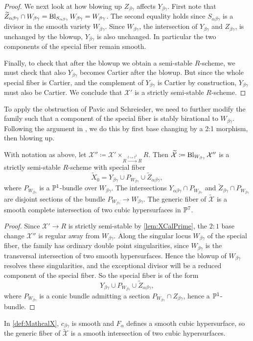 \begin{proof}
We next look at how blowing up $Z_{\beta \gamma}$ affects $Y_{\beta \gamma}$. First note that  $\widetilde{Z}_{\alpha\beta\gamma} \cap W_{\beta\gamma} = \Bl_{S_{\alpha\beta\gamma}} W_{\beta\gamma} = W_{\beta\gamma}$. The second equality holds since $S_{\alpha\beta\gamma}$ is a divisor in the smooth variety $W_{\beta\gamma}$. Since $W_{\beta\gamma}$, the intersection of $Y_{\beta \gamma}$ and $Z_{\beta \gamma}$, is unchanged by the blowup, $Y_{\beta \gamma}$ is also unchanged. In particular the two components of the special fiber remain smooth.

Finally, to check that after the blowup we obtain a semi-stable $R$-scheme, we must check that also $Y_{\beta \gamma}$ becomes Cartier after the blowup. But since the whole special fiber is Cartier, and the complement of $Y_{\beta \gamma}$ is Cartier by construction, $Y_{\beta \gamma}$ must also be Cartier. We conclude that $\mathcal{X}'$ is a strictly semi-stable $R$-scheme.
\end{proof}

To apply the obstruction of Pavic and Schreieder, we need to further modify the family such that a component of the special fiber is stably birational to $W_{\beta \gamma}$. Following the argument in \cite{PavicSchreieder}, we do this by first base changing by a 2:1 morphism, then blowing up.
\begin{lemma}
  \label{lem:XCalDoublePrime}
  With notation as above, let $\mathcal{X}'' \coloneqq \mathcal{X}' \times_{R \xrightarrow{t \mapsto t^2} R} R$. Then $\widetilde{\mathcal{X}} \coloneqq \Bl_{W_{\beta\gamma}} \mathcal{X}''$ is a strictly semi-stable $R$-scheme with special fiber 
\[ \widetilde{X}_0 = Y_{\beta\gamma} \cup P_{W_{\beta\gamma}} \cup \widetilde{Z}_{\alpha \beta\gamma}, \]
where $P_{W_{\beta\gamma}}$ is a $\P^1$-bundle over $W_{\beta\gamma}$. The intersections $Y_{\alpha \beta\gamma} \cap P_{W_{\beta\gamma}}$ and $\widetilde{Z}_{\beta\gamma} \cap P_{W_{\beta\gamma}}$ are disjoint sections of the bundle $P_{W_{\beta\gamma}} \to W_{\beta\gamma}$. The generic fiber of $\widetilde{\mathcal{X}}$ is a smooth complete intersection of two cubic hypersurfaces in $\P^7$.
\end{lemma}
\begin{proof}
	Since $\mathcal{X}' \to R$ is strictly semi-stable by \cref{lem:XCalPrime}, the $2 \mathbin{:} 1$ base change $\mathcal{X}''$ is regular away from $W_{\beta \gamma}$. Along the singular locus $W_{\beta\gamma}$ of the special fiber, the family has ordinary double point singularities, since $W_{\beta \gamma}$ is the transversal intersection of two smooth hypersurfaces. Hence the blowup of $W_{\beta\gamma}$ resolves these singularities, and the exceptional divisor will be a reduced component of the special fiber. So the special fiber is of the form
	\[Y_{\beta\gamma} \cup P_{W_{\beta\gamma}} \cup \widetilde{Z}_{\alpha \beta\gamma},\]
	where $P_{W_{\beta\gamma}}$ is a conic bundle admitting a section $P_{W_{\beta\gamma}} \cap Z_{\beta\gamma}$, hence a $\P^1$-bundle.
\end{proof}
 In \cref{def:MathcalX}, $c_{\beta \gamma}$ is smooth and $F_\alpha$ defines a smooth cubic hypersurface, so the generic fiber of $\widetilde{\mathcal{X}}$ is a smooth intersection of two cubic hypersurfaces.

